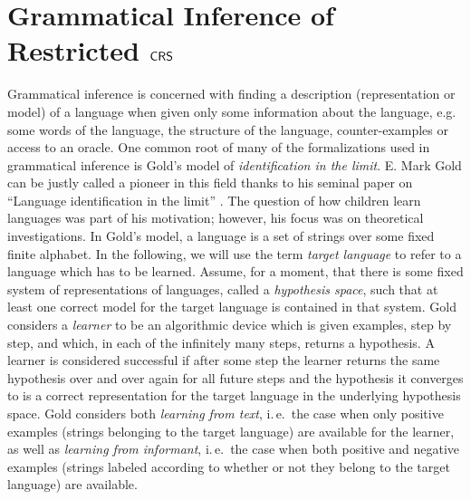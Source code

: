 \section{Grammatical Inference of Restricted $\mbox{\sf CRS\/}$}\label{section:inference}

Grammatical inference is concerned with finding a description (representation or model) of a language when given only some information about the language, e.g. some words of the language, the structure of the language, counter-examples or access to an oracle.
One common root of many of the formalizations used in grammatical inference is Gold's model of \emph{identification in the limit}. E. Mark Gold can be justly called a pioneer in this field thanks to his seminal paper on ``Language identification in the limit'' \cite{Gold67limit}. The question of how children learn languages was part of his motivation; however, his focus was on theoretical investigations.
In Gold's model, a language is a set of strings over some fixed finite alphabet. In the following, we will use the term \emph{target language} to refer to a language which has to be learned. 
Assume, for a moment, that there is some fixed system of representations of languages, called a \emph{hypothesis space}, such that at least one correct model for the target language is contained in that system. Gold considers a \emph{learner} to be an algorithmic device which is given examples, step by step, and which, in each of the infinitely many steps, returns a hypothesis. A learner is considered successful if after some step the learner returns the same hypothesis over and over again for all future steps and the hypothesis it converges to is a correct representation for the target language in the underlying hypothesis space.
Gold considers both \emph{learning from text}, i.\,e.\ the case when only positive examples (strings belonging to the target language) are available for the learner, as well as \emph{learning from informant}, i.\,e.\ the case when both positive and negative examples (strings labeled according to whether or not they belong to the target language) are available. %

